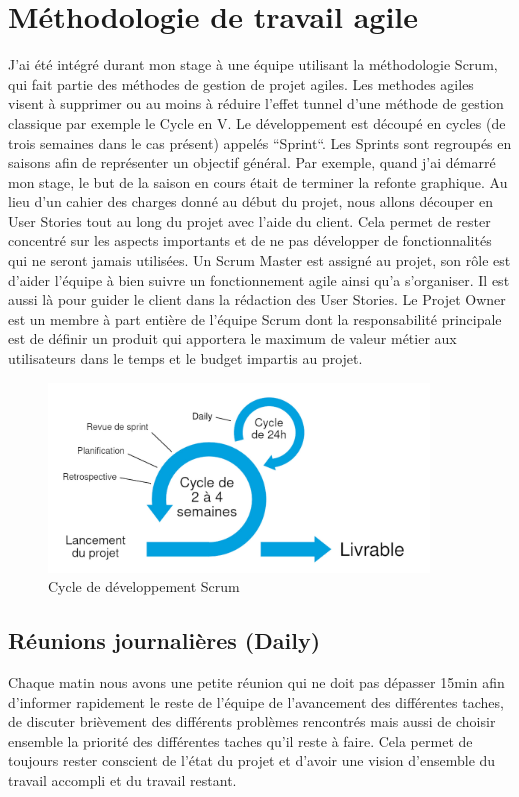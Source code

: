 \documentclass[12pt, a4paper]{report}
\begin{document}
\chapter{Méthodologie de travail agile}
J'ai été intégré durant mon stage à une équipe utilisant la méthodologie Scrum, qui fait partie des méthodes de gestion de projet agiles. Les methodes agiles visent à supprimer ou au moins à réduire l'effet tunnel d'une méthode de gestion classique par exemple le Cycle en V.\newline
Le développement est découpé en cycles (de trois semaines dans le cas présent) appelés ``Sprint``.\newline
Les Sprints sont regroupés en saisons afin de représenter un objectif général.
Par exemple, quand j'ai démarré mon stage, le but de la saison en cours était de terminer la refonte graphique.
Au lieu d'un cahier des charges donné au début du projet, nous allons découper en User Stories tout au long du projet avec l'aide du client.\newline
Cela permet de rester concentré sur les aspects importants et de ne pas développer de fonctionnalités qui ne seront jamais utilisées.\newline
Un Scrum Master est assigné au projet, son rôle est d'aider l'équipe à bien suivre un fonctionnement agile ainsi qu'a s'organiser. Il est aussi là pour guider le client dans la rédaction des User Stories.
Le Projet Owner est un membre à part entière de l’équipe Scrum dont la responsabilité principale est de définir un produit qui apportera le maximum de valeur métier aux utilisateurs dans le temps et le budget impartis au projet.
\begin{figure}[H]
    \begin{center}
        \includegraphics[width=0.9\textwidth]{scrum.jpg}
    \end{center}
    \caption{Cycle de développement Scrum}
\end{figure}
\section{Réunions journalières (Daily)}
Chaque matin nous avons une petite réunion qui ne doit pas dépasser 15min afin d'informer rapidement le reste de l'équipe de l'avancement des différentes taches, de discuter brièvement des différents problèmes rencontrés mais aussi de choisir ensemble la priorité des différentes taches qu'il reste à faire.\newline
Cela permet de toujours rester conscient de l'état du projet et d'avoir une vision d'ensemble du travail accompli et du travail restant.
\end{document}
